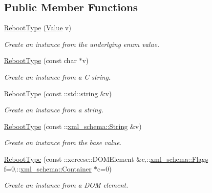 \subsection*{Public Member Functions}
\begin{DoxyCompactItemize}
\item 
\hyperlink{classopenstack_1_1xml_1_1RebootType_afc3f6d75b257cc2fde5ef9a2cc0ef7d9}{RebootType} (\hyperlink{classopenstack_1_1xml_1_1RebootType_afe8138afe9dd78bfeaae341a94d6d793}{Value} v)
\begin{DoxyCompactList}\small\item\em Create an instance from the underlying enum value. \item\end{DoxyCompactList}\item 
\hyperlink{classopenstack_1_1xml_1_1RebootType_ae01cef9e7ed2653f7517827c3cc08bf6}{RebootType} (const char $\ast$v)
\begin{DoxyCompactList}\small\item\em Create an instance from a C string. \item\end{DoxyCompactList}\item 
\hyperlink{classopenstack_1_1xml_1_1RebootType_a985c52632aa0433b8d3ceef43695f5df}{RebootType} (const ::std::string \&v)
\begin{DoxyCompactList}\small\item\em Create an instance from a string. \item\end{DoxyCompactList}\item 
\hyperlink{classopenstack_1_1xml_1_1RebootType_a18bcecf8e11633e011dd61eb4bd79bd8}{RebootType} (const ::\hyperlink{namespacexml__schema_af6757b5701ccc893f3b551bd70e0c94d}{xml\_\-schema::String} \&v)
\begin{DoxyCompactList}\small\item\em Create an instance from the base value. \item\end{DoxyCompactList}\item 
\hyperlink{classopenstack_1_1xml_1_1RebootType_a288f863db4b0f1e4e5ba9ff284d3ef7c}{RebootType} (const ::xercesc::DOMElement \&e,::\hyperlink{namespacexml__schema_affb4c227cbd9aa7453dd1dc5a1401943}{xml\_\-schema::Flags} f=0,::\hyperlink{namespacexml__schema_a333dea2213742aea47a37532dec4ec27}{xml\_\-schema::Container} $\ast$c=0)
\begin{DoxyCompactList}\small\item\em Create an instance from a DOM element. \item\end{DoxyCompactList}\item 

\end{DoxyCompactItemize}
